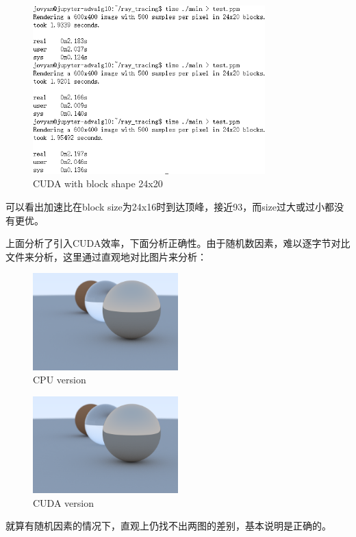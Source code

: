 \documentclass[UTF8, a4paper, 11pt]{article}
\begin{document}
\begin{figure}[H]
    \centering
    \includegraphics[width=0.8\textwidth]{24x20.png}
    \caption{CUDA with block shape 24x20}
\end{figure}
可以看出加速比在block size为24x16时到达顶峰，接近93，而size过大或过小都没有更优。

上面分析了引入CUDA效率，下面分析正确性。由于随机数因素，难以逐字节对比文件来分析，这里通过直观地对比图片来分析：
\begin{figure}[H]
    \centering
    \includegraphics[width=0.5\textwidth, bb=0 0 20cm 20cm]{test_cpu.bmp}
    \caption{CPU version}
\end{figure}
\begin{figure}[H]
    \centering
    \includegraphics[width=0.5\textwidth, bb=0 0 20cm 20cm]{test.bmp}
    \caption{CUDA version}
\end{figure}
就算有随机因素的情况下，直观上仍找不出两图的差别，基本说明是正确的。
\end{document}

